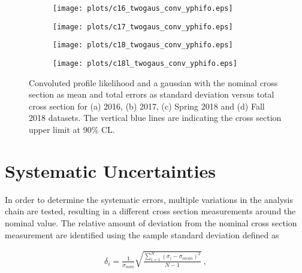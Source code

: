 \begin{center}
\null
\vfill
\begin{figure}[H]
    \centering
    \begin{subfigure}[b]{0.49\textwidth}
        \texttt{[image: plots/c16\_twogaus\_conv\_yphifo.eps]}
        \caption{}
        \label{fig.y2175.xsec_ul.yphifo.2.a}
    \end{subfigure}
    \begin{subfigure}[b]{0.49\textwidth}
        \texttt{[image: plots/c17\_twogaus\_conv\_yphifo.eps]}
        \caption{}
        \label{fig.y2175.xsec_ul.yphifo.2.b}
    \end{subfigure}
    \begin{subfigure}[b]{0.49\textwidth}
        \texttt{[image: plots/c18\_twogaus\_conv\_yphifo.eps]}
        \caption{}
        \label{fig.y2175.xsec_ul.yphifo.2.c}
    \end{subfigure}
    \begin{subfigure}[b]{0.49\textwidth}
        \texttt{[image: plots/c18l\_twogaus\_conv\_yphifo.eps]}
        \caption{}
        \label{fig.y2175.xsec_ul.yphifo.2.d}
    \end{subfigure}
    \caption{Convoluted profile likelihood and a gaussian with the nominal cross section as mean and total errors as standard deviation versus total cross section for (a) 2016, (b) 2017, (c) Spring 2018 and (d) Fall 2018 datasets. The vertical blue lines are indicating the cross section upper limit at 90$\%$ CL.}
    \label{fig.y2175.xsec_ul.yphifo.2}
\end{figure}
\null
\vfill
\end{center}

\section{Systematic Uncertainties}
\label{chap.y2175.syserr}

In order to determine the systematic errors, multiple variations in the analysis chain are tested, resulting in a different cross section measurements around the nominal value. The relative amount of deviation from the nominal cross section measurement are identified using the sample standard deviation defined as

\begin{equation}
    \label{eq.y2175.syserr.4.5}
    \begin{aligned}
        \delta_{i} = \frac{1}{\sigma_{nom}} \sqrt{\frac{\sum\limits_{i=1}^{N} (\sigma_{i} - \sigma_{mean})^2}{N-1}}~,\\
    \end{aligned}
\end{equation}

